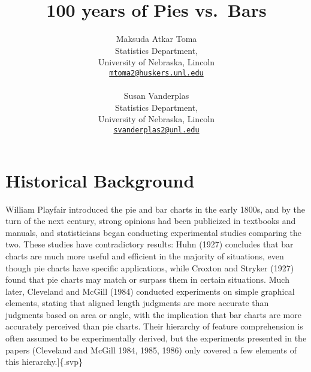 \documentclass[
  10pt,
  letterpaper,
  twocolumn]{article}
\title{100 years of Pies vs.~Bars}
\author{
Maksuda Atkar Toma\\
Statistics Department, \\University of Nebraska, Lincoln\\
{\tt \href{mailto:mtoma2@huskers.unl.edu}{mtoma2@huskers.unl.edu}}\\
\\\And
Susan Vanderplas\\
Statistics Department, \\University of Nebraska, Lincoln\\
{\tt \href{mailto:svanderplas2@unl.edu}{svanderplas2@unl.edu}}\\
}
\date{}
\newcommand{\svp}[1]{{\textcolor{RedOrange}{#1}}}
\begin{document}
\maketitle
\ifdefined\Shaded\renewenvironment{Shaded}{\begin{tcolorbox}[frame hidden, enhanced, breakable, boxrule=0pt, interior hidden, sharp corners, borderline west={3pt}{0pt}{shadecolor}]}{\end{tcolorbox}}\fi

\hypertarget{historical-background}{%
\section{Historical Background}\label{historical-background}}

William Playfair introduced the pie and bar charts in the early
1800s\svp{, and by the turn of the next century, strong opinions had
been publicized in textbooks and manuals, and statisticians began
conducting experimental studies comparing the two.} \svp{These studies
have contradictory results:} Huhn (1927) concludes that bar charts are
much more useful and efficient in the majority of situations, even
though pie charts have specific applications\svp{, while Croxton and
Stryker (1927) found that pie charts may match or surpass them in
certain situations.} \svp{Much later, Cleveland and McGill (1984)
conducted experiments on simple graphical elements, stating that aligned
length judgments are more accurate than judgments based on area or
angle, with the implication that bar charts are more accurately
perceived than pie charts.} Their hierarchy of feature comprehension is
often assumed to be experimentally derived, but the experiments
presented in the papers (Cleveland and McGill 1984, 1985, 1986) only
covered a few elements of this hierarchy.{]}\{.svp\}
\end{document}
